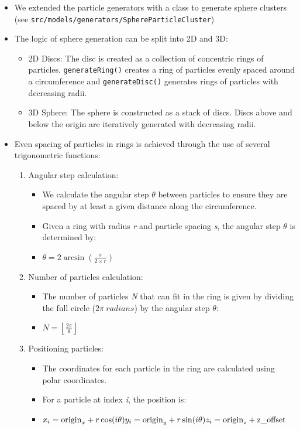 \documentclass{article}
\begin{document}
\begin{itemize}
    \item We extended the particle generators with a class to generate sphere clusters (see \texttt{src/models/generators/SphereParticleCluster})
    \item The logic of sphere generation can be split into 2D and 3D:
    \begin{itemize}
        \item 2D Discs: The disc is created as a collection of concentric rings of particles. \texttt{generateRing()} creates a ring of particles evenly spaced around a circumference and \texttt{generateDisc()} generates rings of particles with decreasing radii.
        \item 3D Sphere: The sphere is constructed as a stack of discs. Discs above and below the origin are iteratively generated with decreasing radii.
    \end{itemize}
    \item Even spacing of particles in rings is achieved through the use of several trigonometric functions:
    \begin{enumerate}
        \item Angular step calculation:
        \begin{itemize}
            \item We calculate the angular step $\theta$ between particles to ensure they are spaced by at least a given distance along the circumference.
            \item Given a ring with radius \textit{r} and particle spacing \textit{s}, the angular step $\theta$ is determined by:
            \item $\theta = 2 \arcsin\left(\frac{s}{2 \times r}\right)$
        \end{itemize}
        \item Number of particles calculation:
        \begin{itemize}
            \item The number of particles \textit{N} that can fit in the ring is given by dividing the full circle ($2\pi\ radians$) by the angular step $\theta$:
            \item $N = \left\lfloor \frac{2\pi}{\theta} \right\rfloor$
        \end{itemize}
        \item Positioning particles:
        \begin{itemize}
            \item The coordinates for each particle in the ring are calculated using polar coordinates.
            \item For a particle at index \textit{i}, the position is:
            \item $x_i = \text{origin}_x + r \cos(i \theta)\newline y_i = \text{origin}_y + r \sin(i \theta)\newline z_i = \text{origin}_z + \text{z\_offset}$
        \end{itemize}
    \end{enumerate}
\end{itemize}
\end{document}
